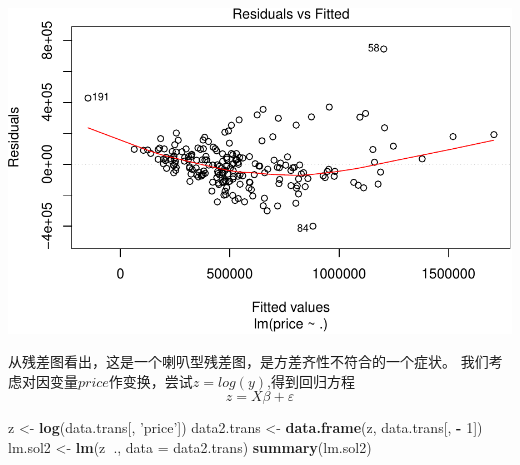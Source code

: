 \documentclass[]{article}
\newenvironment{Shaded}{\begin{snugshade}}{\end{snugshade}}
\newcommand{\KeywordTok}[1]{\textcolor[rgb]{0.13,0.29,0.53}{\textbf{#1}}}
\newcommand{\DataTypeTok}[1]{\textcolor[rgb]{0.13,0.29,0.53}{#1}}
\newcommand{\DecValTok}[1]{\textcolor[rgb]{0.00,0.00,0.81}{#1}}
\newcommand{\StringTok}[1]{\textcolor[rgb]{0.31,0.60,0.02}{#1}}
\newcommand{\OperatorTok}[1]{\textcolor[rgb]{0.81,0.36,0.00}{\textbf{#1}}}
\newcommand{\NormalTok}[1]{#1}
\begin{document}
\includegraphics{FinalProjectForRegressionAnalysis_files/figure-latex/unnamed-chunk-9-1.pdf}

从残差图看出，这是一个喇叭型残差图，是方差齐性不符合的一个症状。
我们考虑对因变量\(price\)作变换，尝试\(z = log(y)\),得到回归方程 \[
z = X\beta +\varepsilon
\]

\begin{Shaded}
\begin{Highlighting}[]
\NormalTok{z <-}\StringTok{ }\KeywordTok{log}\NormalTok{(data.trans[, }\StringTok{'price'}\NormalTok{])}
\NormalTok{data2.trans <-}\StringTok{ }\KeywordTok{data.frame}\NormalTok{(z, data.trans[, }\OperatorTok{-}\StringTok{ }\DecValTok{1}\NormalTok{])}
\NormalTok{lm.sol2 <-}\StringTok{ }\KeywordTok{lm}\NormalTok{(z}\OperatorTok{~}\NormalTok{., }\DataTypeTok{data =}\NormalTok{ data2.trans)}
\KeywordTok{summary}\NormalTok{(lm.sol2)}
\end{Highlighting}
\end{Shaded}
\end{document}
